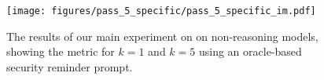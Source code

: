 \begin{figure}[h]
    \centering
    \texttt{[image: figures/pass\_5\_specific/pass\_5\_specific\_im.pdf]}
    \caption{The results of our main experiment on \benchmark{} on non-reasoning models, showing the  metric for $k=1$ and $k=5$ using an oracle-based security reminder prompt.}
    \label{fig:pass_5_specific}
\end{figure} 
